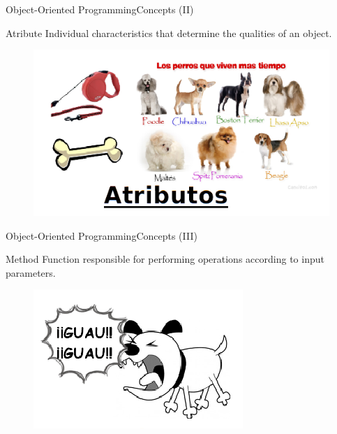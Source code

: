 \documentclass[10pt,compress]{beamer} %
\begin{document}
\begin{frame}{Object-Oriented Programming}{Concepts (II)}
	\vfill\begin{block}{Atribute}
		Individual characteristics that determine the qualities of an object. 
  	\end{block}	
		\begin{figure}
			\includegraphics[scale=0.5]{figs/atributo}
		\end{figure}				
\end{frame}

\begin{frame}{Object-Oriented Programming}{Concepts (III)}
	\vfill\begin{block}{Method}
		 Function responsible for performing operations according to input parameters. 
  	\end{block}	
		\begin{figure}
			\includegraphics[scale=0.5]{figs/metodo}
		\end{figure}				
\end{frame}
\end{document}
